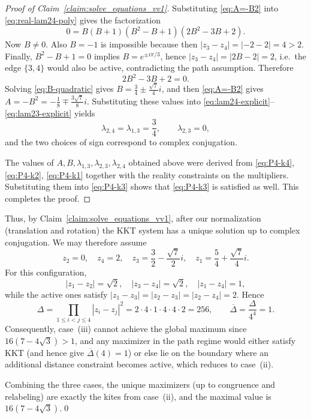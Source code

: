 \documentclass{article}
\theoremstyle{definition}
\let\le\leqslant
\begin{document}
\begin{proof}[Proof of Claim~\ref{claim:solve_equations_vv1}]
Substituting \eqref{eq:A=-B2} into \eqref{eq:real-lam24-poly} gives the factorization
\[
0=B(B+1)(B^2-B+1)(2B^2-3B+2).
\]
Now \(B\neq 0\). Also \(B=-1\) is impossible because then
\(|z_3-z_4|=|-2-2|=4>2\).
Finally, \(B^2-B+1=0\) implies \(B=e^{\pm i\pi/3}\), hence
\(|z_3-z_4|=|2B-2|=2\), i.e.\ the edge \(\{3,4\}\) would also be active, contradicting the path assumption.
Therefore
\begin{equation}\label{eq:B-quadratic}
2B^2-3B+2=0.
\end{equation}
Solving \eqref{eq:B-quadratic} gives \(B=\frac34\pm \frac{\sqrt7}{4}i\), and then \eqref{eq:A=-B2} gives
\(A=-B^2=-\frac18\mp \frac{3\sqrt7}{8}i\).
Substituting these values into \eqref{eq:lam24-explicit}--\eqref{eq:lam23-explicit} yields
\[
\lambda_{2,4}=\lambda_{1,3}=\frac34,\qquad \lambda_{2,3}=0,
\]
and the two choices of sign correspond to complex conjugation.



The values of \(A,B,\lambda_{1,3},\lambda_{2,3},\lambda_{2,4}\) obtained above were derived from
\eqref{eq:P4-k4}, \eqref{eq:P4-k2}, \eqref{eq:P4-k1} together with the reality constraints on the multipliers.
Substituting them into \eqref{eq:P4-k3} shows that \eqref{eq:P4-k3} is satisfied as well. This completes the proof.
\end{proof}



Thus, by Claim~\ref{claim:solve_equations_vv1}, after our normalization (translation and rotation) the KKT system has a unique solution up to complex conjugation. We may therefore assume
\[
z_2=0,\quad z_4=2,\quad z_3=\frac32-\frac{\sqrt7}{2}i,\quad z_1=\frac54+\frac{\sqrt7}{4}i.
\]
For this configuration,
\[
|z_1-z_2|=\sqrt2,\quad |z_3-z_4|=\sqrt2,\quad |z_1-z_4|=1,
\]
while the active ones satisfy \(|z_1-z_3|=|z_2-z_3|=|z_2-z_4|=2\).
Hence
\[
\Delta=\prod_{1\le i<j\le 4}|z_i-z_j|^2
=2 \cdot 4 \cdot 1 \cdot 4 \cdot 4 \cdot 2 =256,
\qquad
\overline{\Delta}=\frac{\Delta}{4^4}=1.
\]
Consequently, case~(iii) cannot achieve the global maximum since
\(16(7-4\sqrt3)>1\), and any maximizer in the path regime would either satisfy KKT
(and hence give \(\overline{\Delta}(4)=1\)) or else lie on the boundary where an additional
distance constraint becomes active, which reduces to case~(ii).

\smallskip
Combining the three cases, the unique maximizers (up to congruence and relabeling) are exactly the kites from case~(ii),
and the maximal value is \(16(7-4\sqrt3)\).\qed
\end{document}

